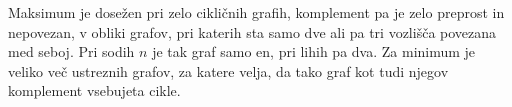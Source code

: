 \documentclass[12pt]{article}
\begin{document}
\vspace{12pt}
\noindent Maksimum je dosežen pri zelo cikličnih grafih, komplement pa je zelo preprost in nepovezan, v obliki grafov, pri katerih sta samo dve ali pa tri vozlišča povezana med seboj. Pri sodih $n$ je tak graf samo en, pri lihih pa dva. Za minimum je veliko več ustreznih grafov, za katere velja, da tako graf kot tudi njegov komplement vsebujeta cikle.
\end{document}
